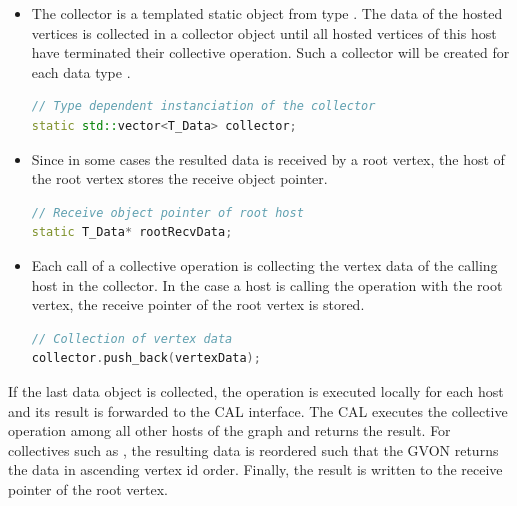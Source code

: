 \begin{itemize}
\item []
  The collector is a templated static object from type
  .  The data of the hosted vertices is
  collected in a collector object until all hosted vertices of this
  host have terminated their collective operation. Such a collector
  will be created for each data type .
  \begin{lstlisting}[language=C++, label=lst:static_collective]
// Type dependent instanciation of the collector
static std::vector<T_Data> collector;
  \end{lstlisting}

\item [] Since in some cases the resulted data is received by a root vertex, the host of
the root vertex stores the receive object pointer.

\begin{lstlisting}[language=C++, label=lst:root]
// Receive object pointer of root host
static T_Data* rootRecvData;

\end{lstlisting}

\item [] Each call of a collective operation is collecting the vertex
  data of the calling host in the collector.  In the case a host is
  calling the operation with the root vertex, the receive pointer of
  the root vertex is stored.
  \begin{lstlisting}[language=C++, label=lst:collecting]
// Collection of vertex data
collector.push_back(vertexData);
  \end{lstlisting}

\end{itemize}


\noindent If the last data object is collected, the
operation is executed locally for each host and its result is forwarded to the CAL
interface. The CAL executes the collective operation among all
other hosts of the graph and returns the result. For collectives such as
, the resulting data is reordered such that the GVON returns the
data in ascending vertex id order. Finally, the result is written to the receive
pointer of the root vertex.


